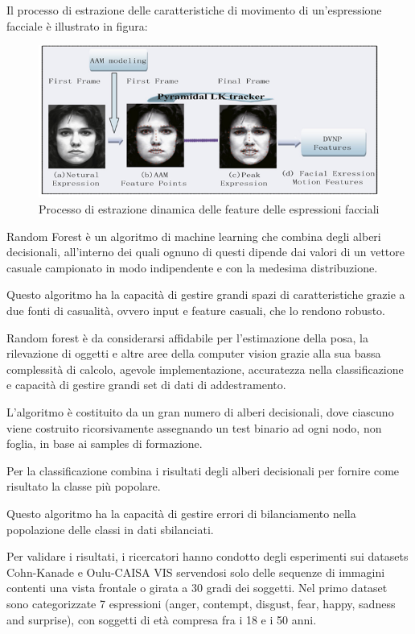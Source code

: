 Il processo di estrazione delle caratteristiche di movimento di un’espressione facciale è illustrato in figura:
\begin{figure}
    \begin{center}    
        \includegraphics[width=1\linewidth]{images/14.png}
        \caption{Processo di estrazione dinamica delle feature delle espressioni facciali}
    \end{center}
\end{figure}

Random Forest è un algoritmo di machine learning che combina degli alberi decisionali, all’interno dei quali ognuno di questi dipende dai valori di un vettore casuale campionato in modo indipendente e con la medesima distribuzione.

Questo algoritmo ha la capacità di gestire grandi spazi di caratteristiche grazie a due fonti di casualità, ovvero input e feature casuali, che lo rendono robusto. 

Random forest è da considerarsi affidabile per l'estimazione della posa, la rilevazione di oggetti e altre aree della computer vision grazie alla sua bassa complessità di calcolo, agevole implementazione, accuratezza nella classificazione e capacità di gestire grandi set di dati di addestramento. 

L’algoritmo è costituito da un gran numero di alberi decisionali, dove ciascuno viene costruito ricorsivamente assegnando un test binario ad ogni nodo, non foglia, in base ai samples di formazione. 

Per la classificazione combina i risultati degli alberi decisionali per fornire come risultato la classe più popolare. 

Questo algoritmo ha la capacità di gestire errori di bilanciamento nella popolazione delle classi in dati sbilanciati.

Per validare i risultati, i ricercatori hanno condotto degli esperimenti sui datasets Cohn-Kanade e Oulu-CAISA VIS servendosi solo delle sequenze di immagini contenti una vista frontale o girata a 30 gradi dei soggetti.
Nel primo dataset sono categorizzate 7 espressioni (anger, contempt, disgust, fear, happy, sadness and surprise), con soggetti di età compresa fra i 18 e i 50 anni.

